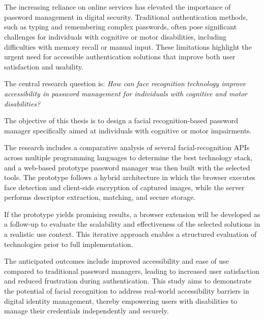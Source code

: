 
\chapter*{}

The increasing reliance on online services has elevated the importance of password management in digital security. Traditional authentication methods, such as typing and remembering complex passwords, often pose significant challenges for individuals with cognitive or motor disabilities, including difficulties with memory recall or manual input. These limitations highlight the urgent need for accessible authentication solutions that improve both user satisfaction and usability.

The central research question is: \emph{How can face recognition technology improve accessibility in password management for individuals with cognitive and motor disabilities?} 

The objective of this thesis is to design a facial recognition-based password manager specifically aimed at individuals with cognitive or motor impairments.

The research includes a comparative analysis of several facial-recognition APIs across multiple programming languages to determine the best technology stack, and a web-based prototype password manager was then built with the selected tools. The prototype follows a hybrid architecture in which the browser executes face detection and client-side encryption of captured images, while the server performs descriptor extraction, matching, and secure storage.

If the prototype yields promising results, a browser extension will be developed as a follow-up to evaluate the scalability and effectiveness of the selected solutions in a realistic use context. This iterative approach enables a structured evaluation of technologies prior to full implementation.

The anticipated outcomes include improved accessibility and ease of use compared to traditional password managers, leading to increased user satisfaction and reduced frustration during authentication. This study aims to demonstrate the potential of facial recognition to address real-world accessibility barriers in digital identity management, thereby empowering users with disabilities to manage their credentials independently and securely.
